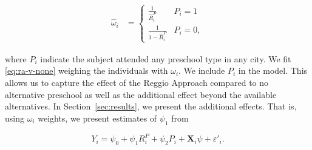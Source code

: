 \begin{align}
	\hat{\omega}_i &= 
	\begin{cases}
		\frac{1}{\hat{R}_i^{P}} & P_i = 1  \\
		\frac{1}{1-\hat{R}_i^{P}} & P_i = 0,
	\end{cases}
\end{align}

\noindent where $P_i$ indicate the subject attended any preschool type in any city. We fit \eqref{eq:ra-v-none} weighing the individuals with $\omega_i$. We include $P_i$ in the model. This allows us to capture the effect of the Reggio Approach compared to no alternative preschool as well as the additional effect beyond the available alternatives. In Section~\ref{sec:results}, we present the additional effects. That is, using $\hat{\omega}_i$ weights, we present estimates of $\psi_1$ from

\begin{equation}
	Y_i = \psi_0 + \psi_1 R_i^{P} + \psi_2 P_i + \bm{X}_i \psi + \varepsilon'_i.
\end{equation}


